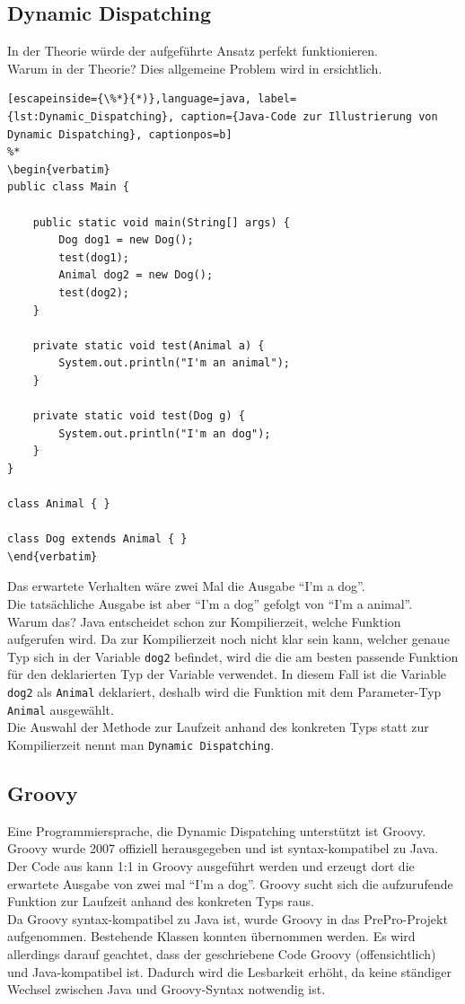 \subsection{Dynamic Dispatching}
In der Theorie würde der aufgeführte Ansatz perfekt funktionieren.\\
Warum in der Theorie?
Dies allgemeine Problem wird in  ersichtlich.

\begin{lstlisting}[escapeinside={\%*}{*)},language=java, label={lst:Dynamic_Dispatching}, caption={Java-Code zur Illustrierung von Dynamic Dispatching}, captionpos=b]
%*
\begin{verbatim}
public class Main {

    public static void main(String[] args) {
        Dog dog1 = new Dog();
        test(dog1);
        Animal dog2 = new Dog();
        test(dog2);
    }

    private static void test(Animal a) {
        System.out.println("I'm an animal");
    }

    private static void test(Dog g) {
        System.out.println("I'm an dog");
    }
}

class Animal { }

class Dog extends Animal { }
\end{verbatim}
\end{lstlisting}
Das erwartete Verhalten wäre zwei Mal die Ausgabe ``I'm a dog''.\\
Die tatsächliche Ausgabe ist aber ``I'm a dog'' gefolgt von ``I'm a animal''.\\
Warum das?
Java entscheidet schon zur Kompilierzeit, welche Funktion aufgerufen wird.
Da zur Kompilierzeit noch nicht klar sein kann, welcher genaue Typ sich in der Variable \texttt{dog2} befindet, wird die die am besten passende Funktion für den deklarierten Typ der Variable verwendet. In diesem Fall ist die Variable \texttt{dog2} als \texttt{Animal} deklariert, deshalb wird die Funktion mit dem Parameter-Typ \texttt{Animal} ausgewählt.\\
Die Auswahl der Methode zur Laufzeit anhand des konkreten Typs statt zur Kompilierzeit nennt man \texttt{Dynamic Dispatching}.\\

\subsection{Groovy}
Eine Programmiersprache, die Dynamic Dispatching unterstützt ist Groovy.
Groovy wurde 2007 offiziell herausgegeben und ist syntax-kompatibel zu Java.
Der Code aus  kann 1:1 in Groovy ausgeführt werden und erzeugt dort die erwartete Ausgabe von zwei mal ``I'm a dog''.
Groovy sucht sich die aufzurufende Funktion zur Laufzeit anhand des konkreten Typs raus.\\
Da Groovy syntax-kompatibel zu Java ist, wurde Groovy in das PrePro-Projekt aufgenommen.
Bestehende Klassen konnten übernommen werden.
Es wird allerdings darauf geachtet, dass der geschriebene Code Groovy (offensichtlich) und Java-kompatibel ist.
Dadurch wird die Lesbarkeit erhöht, da keine ständiger Wechsel zwischen Java und Groovy-Syntax notwendig ist.

